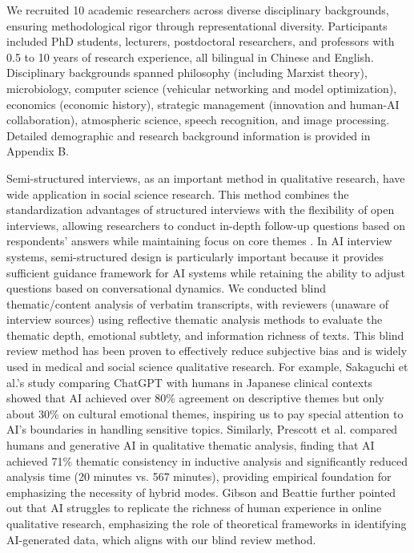 \documentclass[sigchi,nonacm,manuscript]{acmart}
\begin{document}
We recruited 10 academic researchers across diverse disciplinary backgrounds, ensuring methodological rigor through representational diversity. Participants included PhD students, lecturers, postdoctoral researchers, and professors with 0.5 to 10 years of research experience, all bilingual in Chinese and English. Disciplinary backgrounds spanned philosophy (including Marxist theory), microbiology, computer science (vehicular networking and model optimization), economics (economic history), strategic management (innovation and human-AI collaboration), atmospheric science, speech recognition, and image processing. Detailed demographic and research background information is provided in Appendix B.

Semi-structured interviews, as an important method in qualitative research, have wide application in social science research. This method combines the standardization advantages of structured interviews with the flexibility of open interviews, allowing researchers to conduct in-depth follow-up questions based on respondents' answers while maintaining focus on core themes \citep{brinkmannQualitativeInterviewing2013}. In AI interview systems, semi-structured design is particularly important because it provides sufficient guidance framework for AI systems while retaining the ability to adjust questions based on conversational dynamics. We conducted blind thematic/content analysis of verbatim transcripts, with reviewers (unaware of interview sources) using reflective thematic analysis methods to evaluate the thematic depth, emotional subtlety, and information richness of texts. This blind review method has been proven to effectively reduce subjective bias and is widely used in medical and social science qualitative research. For example, Sakaguchi et al.'s \citep{sakaguchiEvaluatingChatGPTQualitative2025} study comparing ChatGPT with humans in Japanese clinical contexts showed that AI achieved over 80\% agreement on descriptive themes but only about 30\% on cultural emotional themes, inspiring us to pay special attention to AI's boundaries in handling sensitive topics. Similarly, Prescott et al. \citep{prescottComparingEfficacyEfficiency2024} compared humans and generative AI in qualitative thematic analysis, finding that AI achieved 71\% thematic consistency in inductive analysis and significantly reduced analysis time (20 minutes vs. 567 minutes), providing empirical foundation for emphasizing the necessity of hybrid modes. Gibson and Beattie \citep{gibsonMoreLessHuman2024} further pointed out that AI struggles to replicate the richness of human experience in online qualitative research, emphasizing the role of theoretical frameworks in identifying AI-generated data, which aligns with our blind review method.
\end{document}
